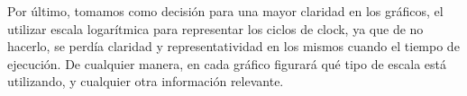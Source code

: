 Por último, tomamos como decisión para una mayor claridad en los gráficos, el utilizar escala logarítmica para representar los ciclos de clock, ya que de no hacerlo, se perdía claridad y representatividad en los mismos cuando el tiempo de ejecución. De cualquier manera, en cada gráfico figurará qué tipo de escala está utilizando, y cualquier otra información relevante.\\\\\\\\\\\\\\\\\\

